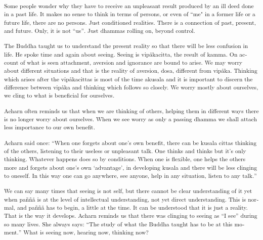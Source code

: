 \textsuperscript{\textdutch{Some people wonder why they have to receive
an unpleasant result produced by an ill deed done in a past life.
}\textenglish[variant=american]{It makes no sense to think in terms of
persons, or even of }``\textenglish[variant=american]{me" in a former
life or a future life, there are no persons. Just conditioned
realities.}\textdutch{ }\textenglish[variant=american]{There is
}\textdutch{a }\textenglish[variant=american]{connection of past,
present,}\textdutch{ and}\textenglish[variant=american]{ future. Only,
it is not }\textdutch{``us''}\textenglish[variant=american]{. Just
}\textdutch{dhammas}\textenglish[variant=american]{ rolling on, beyond
control.}}

\textsuperscript{\textdutch{The Buddha taught us to understand the
present reality so that there will be less confusion in life. He spoke
time and again about seeing. Seeing is vipåkacitta, the result of kamma.
On account of what is seen attachment, aversion and ignorance are bound
to arise. We may worry about different situations and that is the
reality of aversion, dosa, different from vipåka. Thinking which arises
after the vipåkacittas is most of the time akusala and it is important
to discern the difference between vipåka and thinking which follows so
closely. We worry mostly about ourselves, we cling to what is beneficial
for ourselves. }}

\textsuperscript{\textdutch{Acharn often reminds us that when we are
thinking of others, helping them in different ways there is no longer
worry about ourselves. When we see worry as only a passing dhamma we
shall attach less importance to our own benefit. }}

\textsuperscript{\textdutch{Acharn said once:
``}\textenglish[variant=american]{When one forgets about one's own
benefit, there can be kusala cittas thinking of the others, listening to
their useless or unpleasant talk. One thinks and thinks but it's only
thinking. Whatever happens does so by conditions. When one is flexible,
one helps the others more and forgets about one's own
}\textdutch{`}\textenglish[variant=american]{advantage}\textdutch{'},
\textdutch{in }\textenglish[variant=american]{developing kusala and
}\textdutch{there will be }\textenglish[variant=american]{less clinging
to oneself. }\textdutch{In t}\textenglish[variant=american]{his way one
can go anywhere, see anyone, help in any situation, listen to any
talk.}\textdutch{''}}

\textsuperscript{\textenglish[variant=american]{We can say many times
that seeing is not self, but there cannot be clear understanding of it
yet when pa}ñ\textdutch{ñå}\textenglish[variant=american]{ is at the
level of intellectual understanding, not yet direct understanding. This
is normal, and pa}ññ\textdutch{å}\textenglish[variant=american]{ has to
begin, a little at the time. It can be understood that it is just a
reality. That is the way it develops. Acharn reminds us that there was
clinging to seeing as }``\textenglish[variant=american]{I see}''
\textenglish[variant=american]{during so many lives. She always says:
}\textdutch{``T}\textenglish[variant=american]{he study of what the
Buddha taught has to be at this
moment.}\textdutch{''}\textenglish[variant=american]{ What is seeing
now, hearing now, thinking now?}}

